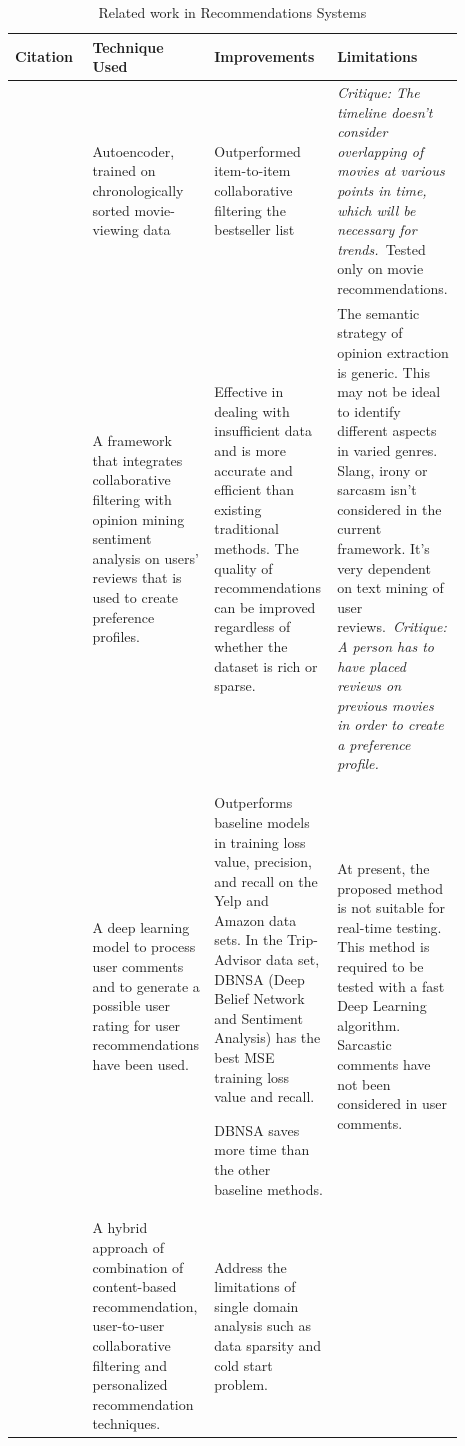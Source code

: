 \vspace{-4mm}
\begin{longtable}{|p{0.17\linewidth}|p{0.18\linewidth}|p{0.27\linewidth}|p{0.27\linewidth}|} 
\caption{Related work in Recommendations Systems}
\label{tab:related-work-table}\\
\hline
Citation & Technique Used & Improvements & Limitations \\ 
\hline
\autocite{larry_history_2019} & Autoencoder, trained on chronologically sorted movie-viewing data & Outperformed item-to-item collaborative filtering  the bestseller list & \textit{Critique: The timeline doesn't consider overlapping of movies at various points in time, which will be necessary for trends.~}Tested only on movie recommendations. \\ 
\hline
\autocite{cheng_hybrid_2020} & A framework that integrates collaborative filtering with opinion mining  sentiment analysis on users' reviews that is used to create preference profiles. & Effective in dealing with insufficient data and is more accurate and efficient than existing traditional methods. The quality of recommendations can be improved regardless of whether the dataset is rich or sparse. & The semantic strategy of opinion extraction is generic. This may not be ideal to identify different aspects in varied genres. Slang, irony or sarcasm isn't considered in the current framework. It's very dependent on text mining of user reviews.~\textit{Critique: A person has to have placed reviews on previous movies in order to create a preference profile.} \\
\hline
\autocite{chen_user_2019} & A deep learning model to process user comments and to generate a possible user rating for user recommendations have been used. & Outperforms baseline models in training loss value, precision, and recall on the Yelp and Amazon data sets. In the Trip-Advisor data set, DBNSA (Deep Belief Network and Sentiment Analysis) has the best MSE training loss value and recall.

DBNSA saves more time than the other baseline methods. & At present, the proposed method is not suitable for real-time testing. This method is required to be tested with a fast Deep Learning algorithm. Sarcastic comments have not been considered in user comments. \\ 
\hline
\autocite{ayushi_cross-domain_2018} & A hybrid approach of combination of content-based recommendation, user-to-user collaborative filtering and personalized recommendation techniques. & Address the limitations of single domain analysis such as data sparsity and cold start problem.


\end{longtable}
